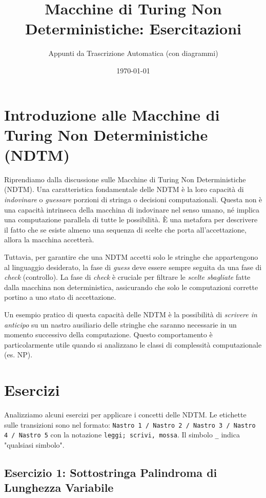 \documentclass[a4paper]{article}
\title{Macchine di Turing Non Deterministiche: Esercitazioni}
\author{Appunti da Trascrizione Automatica (con diagrammi)}
\date{\today}
\begin{document}
\maketitle
\tableofcontents
\newpage

\section{Introduzione alle Macchine di Turing Non Deterministiche (NDTM)}

Riprendiamo dalla discussione sulle Macchine di Turing Non Deterministiche (NDTM).
Una caratteristica fondamentale delle NDTM è la loro capacità di \textit{indovinare} o \textit{guessare} porzioni di stringa o decisioni computazionali. Questa non è una capacità intrinseca della macchina di indovinare nel senso umano, né implica una computazione parallela di tutte le possibilità. È una metafora per descrivere il fatto che se esiste almeno una sequenza di scelte che porta all'accettazione, allora la macchina accetterà.

Tuttavia, per garantire che una NDTM accetti solo le stringhe che appartengono al linguaggio desiderato, la fase di \textit{guess} deve essere sempre seguita da una fase di \textit{check} (controllo). La fase di \textit{check} è cruciale per filtrare le \textit{scelte sbagliate} fatte dalla macchina non deterministica, assicurando che solo le computazioni corrette portino a uno stato di accettazione.

Un esempio pratico di questa capacità delle NDTM è la possibilità di \textit{scrivere in anticipo} su un nastro ausiliario delle stringhe che saranno necessarie in un momento successivo della computazione. Questo comportamento è particolarmente utile quando si analizzano le classi di complessità computazionale (es. NP).

\section{Esercizi}

Analizziamo alcuni esercizi per applicare i concetti delle NDTM. Le etichette sulle transizioni sono nel formato:
\texttt{Nastro 1 / Nastro 2 / Nastro 3 / Nastro 4 / Nastro 5}
con la notazione \texttt{leggi; scrivi, mossa}. Il simbolo \texttt{\_} indica "qualsiasi simbolo".

\subsection{Esercizio 1: Sottostringa Palindroma di Lunghezza Variabile}
\end{document}

